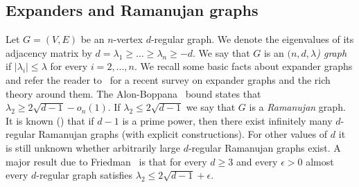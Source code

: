 \documentclass[12pt]{article}
\newtheorem{open question}[theorem]{Open question}
\begin{document}
\subsection{Expanders and Ramanujan graphs}
Let $G=(V,E)$ be an $n$-vertex $d$-regular graph. We denote the eigenvalues of its adjacency matrix by 
$d=\lambda_1 \ge \ldots \ge \lambda_n \ge -d$. We say that $G$ is
an {\em $(n,d,\lambda$) graph} if $|\lambda_i| \le \lambda$ for every $i=2,...,n$.
We recall some basic facts about expander graphs and refer the reader to~\cite{HLW06}
for a recent survey on expander graphs and the rich theory around them.
The Alon-Boppana~\cite{alon} bound states that
$\lambda_2 \ge 2\sqrt{d-1}-o_n(1)$. If
$\lambda_2 \le 2 \sqrt{d-1}$ we say that $G$ is a {\em Ramanujan} graph.
It is known (\cite{LPS88, Mar88, Mor94}) that if $d-1$ is a prime power, then there
exist infinitely many $d$-regular Ramanujan graphs (with explicit constructions).
For other values of $d$ it is still unknown whether arbitrarily large $d$-regular Ramanujan graphs exist.
A major result due to Friedman~\cite{Fri} is that for every $d \ge 3$
and every $\epsilon > 0$ almost every $d$-regular graph satisfies $\lambda_2 \le 2 \sqrt{d-1}+\epsilon$.
\end{document}
